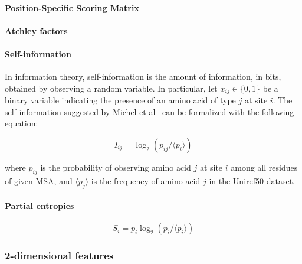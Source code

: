         \paragraph{Position-Specific Scoring Matrix}


        \paragraph{Atchley factors}


        \paragraph{Self-information}

            In information theory, self-information is the amount of information, in bits,
            obtained by observing a random variable. In particular, let $x_{ij} \in \{0, 1\}$ be
            a binary variable indicating the presence of an amino acid of type $j$ at site $i$.
            The self-information suggested by Michel et al~\cite{Michel383133} can be formalized
            with the following equation:

            \begin{equation}
                I_{ij} = \log_2 (p_{ij} / \langle p_i \rangle)
            \end{equation}

            where $p_{ij}$ is the probability of observing amino acid $j$ at site $i$ among all residues
            of given MSA, and $\langle p_j \rangle$ is the frequency of amino acid $j$
            in the Uniref50 dataset.

        \paragraph{Partial entropies}

            \cite{Michel383133}

            \begin{equation}
                S_i = p_i \log_2 (p_i / \langle p_i \rangle)
            \end{equation}

    \subsubsection{2-dimensional features}


